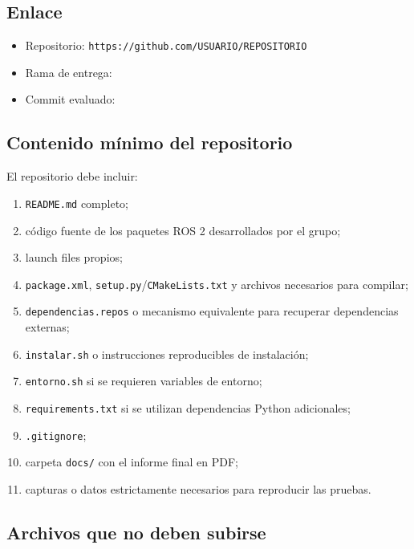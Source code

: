 \documentclass[journal]{IEEEtran}
\newcommand{\pendiente}[1]{\textbf{\color{red}{[#1]}}}
\begin{document}
\subsection{Enlace}

\begin{itemize}
    \item Repositorio: \texttt{https://github.com/USUARIO/REPOSITORIO}
    \item Rama de entrega: \texttt{\pendiente{main}}
    \item Commit evaluado: \texttt{\pendiente{HASH DEL COMMIT FINAL}}
\end{itemize}

\subsection{Contenido mínimo del repositorio}

El repositorio debe incluir:

\begin{enumerate}
    \item \texttt{README.md} completo;
    \item código fuente de los paquetes ROS 2 desarrollados por el grupo;
    \item launch files propios;
    \item \texttt{package.xml}, \texttt{setup.py}/\texttt{CMakeLists.txt} y archivos necesarios para compilar;
    \item \texttt{dependencias.repos} o mecanismo equivalente para recuperar dependencias externas;
    \item \texttt{instalar.sh} o instrucciones reproducibles de instalación;
    \item \texttt{entorno.sh} si se requieren variables de entorno;
    \item \texttt{requirements.txt} si se utilizan dependencias Python adicionales;
    \item \texttt{.gitignore};
    \item carpeta \texttt{docs/} con el informe final en PDF;
    \item capturas o datos estrictamente necesarios para reproducir las pruebas.
\end{enumerate}

\subsection{Archivos que no deben subirse}
\end{document}
